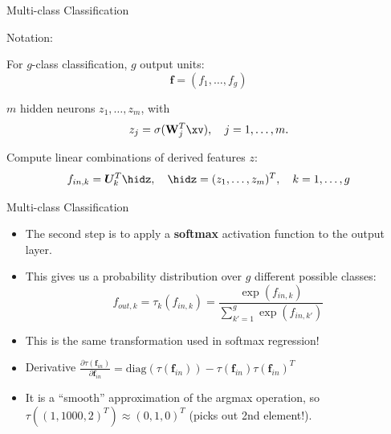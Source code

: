 \begin{frame} {Multi-class Classification}
\vspace{5mm}
\begin{blocki}{Notation:}
\item For $g$-class classification, $g$ output units: $$\mathbf{f} = (f_1, \dots, f_g)$$
\item $m$ hidden neurons $z_1, \dots, z_m$, with
    $$ z_j = \sigma(\mathbf{W}_j^T \xv), \quad j = 1,\ldots,m. $$
\item Compute linear combinations of derived features $z$:
    $$ f_{in,k} = \bm{U}_k^T \hidz, \quad \hidz=(z_1,\dots, z_m)^T, \quad k = 1,\ldots,g$$
\end{blocki}
\end{frame}

\begin{frame} {Multi-class Classification}
  \begin{itemize}
    \item The second step is to apply a \textbf{softmax} activation function to the output layer.
    \vspace{4mm}
    \item This gives us a probability distribution over $g$ different possible classes:
    $$ f_{out,k} = \tau_k(f_{in,k}) = \frac{\exp(f_{in,k})}{\sum_{k'=1}^g\exp(f_{in,k'})}$$
    \vspace{2mm}
    \item This is the same transformation used in softmax regression!
    \vspace{4mm}
    \item Derivative $ \frac{\partial \tau(\mathbf{f}_{in})}{\partial \mathbf{f}_{in}} = \text{diag}(\tau(\mathbf{f}_{in})) - \tau(\mathbf{f}_{in}) \tau(\mathbf{f}_{in})^T $
    \vspace{4mm}
    \item It is a \enquote{smooth} approximation of the argmax operation,
        so $\tau((1, 1000, 2)^T) \approx (0, 1, 0)^T$ (picks out 2nd element!).
  \end{itemize}
\end{frame}

